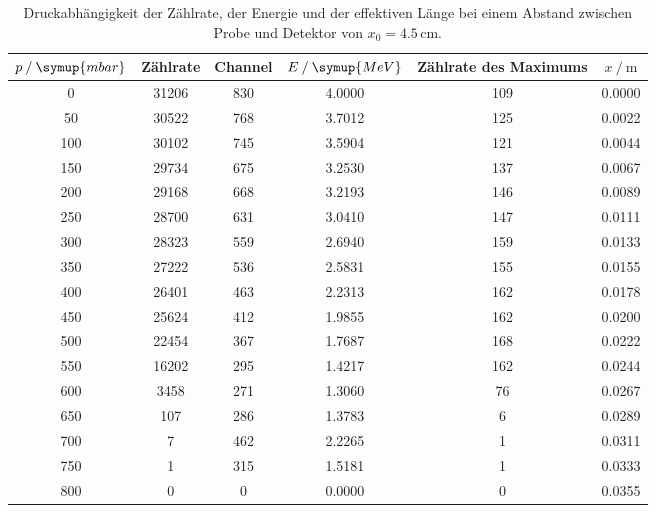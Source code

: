 \begin{table}
  \centering
  \caption{Druckabhängigkeit der Zählrate, der Energie und der effektiven Länge bei einem Abstand zwischen Probe und Detektor von $x_0 = 4.5\,\unit{\cm}$.}
\begin{tabular}{c c c c c c}
  \toprule
  $p \mathbin{/}\symup{mbar}$ &Zählrate& Channel & $E \mathbin{/}\symup{MeV}$ & Zählrate des Maximums & $x \mathbin{/}\unit{\m}$ \\
  \midrule
                    0&31206&830&4.0000&109&0.0000 \\
                    50&30522&768&3.7012&125&0.0022 \\
                   100&30102&745&3.5904&121&0.0044 \\
                   150&29734&675&3.2530&137&0.0067 \\
                   200&29168&668&3.2193&146&0.0089 \\
                   250&28700&631&3.0410&147&0.0111 \\
                   300&28323&559&2.6940&159&0.0133 \\
                   350&27222&536&2.5831&155&0.0155 \\
                   400&26401&463&2.2313&162&0.0178 \\
                   450&25624&412&1.9855&162&0.0200 \\
                   500&22454&367&1.7687&168&0.0222 \\
                   550&16202&295&1.4217&162&0.0244 \\
                     600&3458&271&1.3060&76&0.0267 \\
                       650&107&286&1.3783&6&0.0289 \\
                         700&7&462&2.2265&1&0.0311 \\
                         750&1&315&1.5181&1&0.0333 \\
                           800&0&0&0.0000&0&0.0355 \\
  \bottomrule
  \end{tabular}
  \label{tab:4.5cm}
\end{table}

